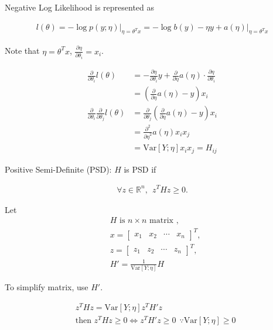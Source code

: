 \begin{answer}
Negative Log Likelihood is represented as

\begin{align*}
    l(\theta) = -\log{p(y;\eta)}\vert_{\eta=\theta^T x} = -\log{b(y)}-\eta y + a(\eta)\vert_{\eta=\theta^T x}
\end{align*}

Note that $\eta = \theta^T x$, $\frac{\partial\eta}{\partial\theta_i} = x_i$.

\begin{align*}
    \frac{\partial}{\partial\theta_i}l(\theta) &= -\frac{\partial\eta}{\partial\theta_i}y + \frac{\partial}{\partial\eta}a(\eta)\cdot\frac{\partial\eta}{\partial\theta_i} \\
    &= \left(\frac{\partial}{\partial\eta}a(\eta) - y\right)x_i \\
    \frac{\partial}{\partial\theta_i}\frac{\partial}{\partial\theta_j}l(\theta) &= \frac{\partial}{\partial\theta_j} \left(\frac{\partial}{\partial\eta}a(\eta) - y\right)x_i \\
    &= \frac{\partial^2}{{\partial\eta}^2}a(\eta)x_i x_j \\
    &= \mathrm{Var}[Y;\eta]x_i x_j = H_{ij}
\end{align*}

Positive Semi-Definite (PSD): $H$ is PSD if

\begin{align*}
    \forall z \in \mathbb{R}^n, ~~ z^T H z \geq 0.
\end{align*}

Let 
\begin{align*}
    &H \text{ is } n\times n \text{ matrix }, \\
    &x = \begin{bmatrix}x_1 & x_2 & \cdots & x_n\end{bmatrix}^T, \\
    &z = \begin{bmatrix}z_1 & z_2 & \cdots & z_n\end{bmatrix}^T, \\
    &H' = \frac{1}{\mathrm{Var}[Y;\eta]} H
\end{align*}

To simplify matrix, use $H'$.

\begin{align*}
    &z^T H z = \mathrm{Var}[Y;\eta] z^T H' z \\
    &\text{then } z^T H z \geq 0 \Leftrightarrow z^T H' z \geq 0 ~~ \because \mathrm{Var}[Y;\eta] \geq 0
\end{align*}


\end{answer}
